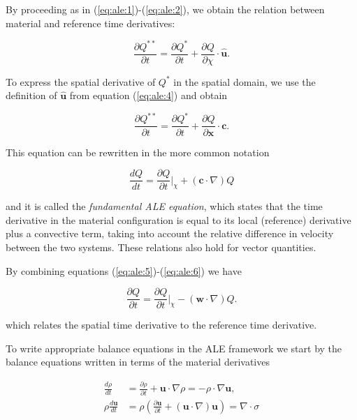 \documentclass[a4paper,11pt,openright,twoside]{book}
\begin{document}
By proceeding as in (\ref{eq:ale:1})-(\ref{eq:ale:2}), we obtain the relation between material and reference time derivatives:

\begin{equation}
\label{eq:ale:3}
\frac{\partial Q^{**}}{\partial t} = \frac{\partial Q^{*}}{\partial t}
+ \frac{\partial Q}{\partial \chi} \cdot \hat{\mathbf{u}}.
\end{equation}

To express the spatial derivative of $Q^{*}$ in the spatial domain, we use the definition of $\hat{\mathbf{u}}$ from equation (\ref{eq:ale:4}) and obtain

\begin{equation}
\frac{\partial Q^{**}}{\partial t} = \frac{\partial Q^{*}}{\partial t}
+ \frac{\partial Q}{\partial \mathbf{x}} \cdot \mathbf{c}.
\end{equation}

This equation can be rewritten in the more common notation

\begin{equation}
\label{eq:ale:5}
\frac{d Q}{d t} = \frac{\partial Q}{\partial t} {\Big |}_\chi + (\mathbf{c} \cdot \nabla) Q
\end{equation}

and it is called the \emph{fundamental ALE equation}, which states that the time derivative in the material configuration is equal to its local (reference) derivative plus a convective term, taking into account the relative difference in velocity between the two systems. These relations also hold for vector quantities.

By combining equations (\ref{eq:ale:5})-(\ref{eq:ale:6}) we have

\begin{equation}
\label{eq:ale:7}
\frac{\partial Q}{\partial t} = \frac{\partial Q}{\partial t} {\Big |}_\chi - (\mathbf{w} \cdot \nabla) Q.
\end{equation}

which relates the spatial time derivative to the reference time derivative.


To write appropriate balance equations in the ALE framework we start by the balance equations written in terms of the material derivatives

\begin{align}
\frac{d \rho}{d t} &= \frac{\partial \rho}{\partial t} + \mathbf{u} \cdot \nabla \rho = - \rho \cdot \nabla \mathbf{u}, \\
\rho \frac{d \mathbf{u}}{d t} &= \rho (\frac{\partial \mathbf{u}}{\partial t} + (\mathbf{u} \cdot \nabla)\mathbf{u}) = \nabla \cdot \sigma
\end{align}
\end{document}
